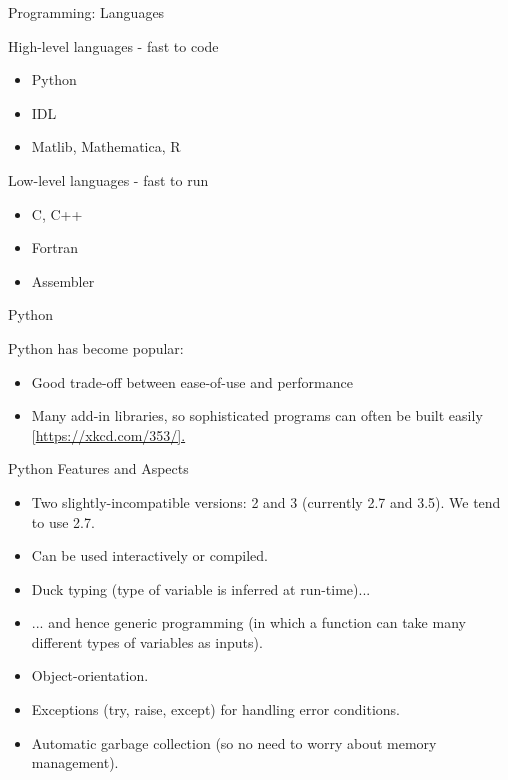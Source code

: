 \documentclass{beamer}
\begin{document}
\begin{frame}{Programming: Languages}
  \begin{block}{High-level languages - fast to code}
    \begin{itemize}
      \item Python
      \item IDL
      \item Matlib, Mathematica, R
    \end{itemize}
    \end{block}
    \begin{block}{Low-level languages - fast to run}
    \begin{itemize}
      \item C, C++
      \item Fortran
      \item Assembler
    \end{itemize}
  \end{block}
\end{frame}

\begin{frame}{Python}
  \begin{block}{Python has become popular:}
    \begin{itemize}
      \item Good trade-off between ease-of-use and performance
      \item Many add-in libraries, so sophisticated programs can often be built easily [\url{https://xkcd.com/353/].}
    \end{itemize}
  \end{block}
\end{frame}

\begin{frame}{Python Features and Aspects}
  \begin{itemize}
    \item Two slightly-incompatible versions: 2 and 3 (currently 2.7 and 3.5). We tend to use 2.7.
    \item Can be used interactively or compiled.
    \item Duck typing (type of variable is inferred at run-time)...
    \item ... and hence generic programming (in which a function can take many different types of variables as inputs).
    \item Object-orientation.
    \item Exceptions (try, raise, except) for handling error conditions.
    \item Automatic garbage collection (so no need to worry about memory management).
  \end{itemize}
\end{frame}
\end{document}
